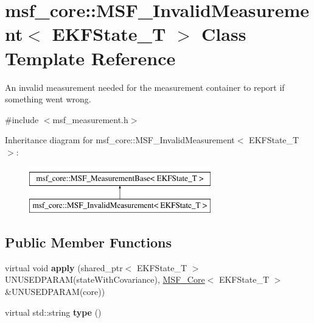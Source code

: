 \hypertarget{classmsf__core_1_1MSF__InvalidMeasurement}{\section{msf\-\_\-core\-:\-:M\-S\-F\-\_\-\-Invalid\-Measurement$<$ E\-K\-F\-State\-\_\-\-T $>$ Class Template Reference}
\label{classmsf__core_1_1MSF__InvalidMeasurement}
}


An invalid measurement needed for the measurement container to report if something went wrong.  




{\ttfamily \#include $<$msf\-\_\-measurement.\-h$>$}

Inheritance diagram for msf\-\_\-core\-:\-:M\-S\-F\-\_\-\-Invalid\-Measurement$<$ E\-K\-F\-State\-\_\-\-T $>$\-:\begin{figure}[H]
\begin{center}
\leavevmode
\includegraphics[height=2.000000cm]{classmsf__core_1_1MSF__InvalidMeasurement}
\end{center}
\end{figure}
\subsection*{Public Member Functions}
\begin{DoxyCompactItemize}
\item 
\hypertarget{classmsf__core_1_1MSF__InvalidMeasurement_a47d514cedc4596c60d0f0949d61200cf}{virtual void {\bfseries apply} (shared\-\_\-ptr$<$ E\-K\-F\-State\-\_\-\-T $>$ U\-N\-U\-S\-E\-D\-P\-A\-R\-A\-M(state\-With\-Covariance), \hyperlink{classmsf__core_1_1MSF__Core}{M\-S\-F\-\_\-\-Core}$<$ E\-K\-F\-State\-\_\-\-T $>$ \&U\-N\-U\-S\-E\-D\-P\-A\-R\-A\-M(core))}\label{classmsf__core_1_1MSF__InvalidMeasurement_a47d514cedc4596c60d0f0949d61200cf}

\item 
\hypertarget{classmsf__core_1_1MSF__InvalidMeasurement_abe3df54c608c49a3a26905b5d953713a}{virtual std\-::string {\bfseries type} ()}\label{classmsf__core_1_1MSF__InvalidMeasurement_abe3df54c608c49a3a26905b5d953713a}

\end{DoxyCompactItemize}
